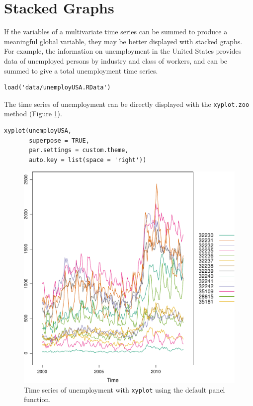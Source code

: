 \section{Stacked Graphs \label{sec:stacked}}
\label{sec:orge4c4b7a}
If the variables of a multivariate time series can be summed to
produce a meaningful global variable, they may be better displayed
with stacked graphs. For example, the information on unemployment in
the United States provides data of unemployed persons by industry and
class of workers, and can be summed to give a total unemployment time
series.

\lstset{language=r,label= ,caption= ,captionpos=b,numbers=none}
\begin{lstlisting}
load('data/unemployUSA.RData')
\end{lstlisting}

The time series of unemployment can be directly displayed
with the \texttt{xyplot.zoo} method (Figure \ref{fig:unemployUSAxyplot}).

\lstset{language=r,label= ,caption= ,captionpos=b,numbers=none}
\begin{lstlisting}
xyplot(unemployUSA,
       superpose = TRUE,
       par.settings = custom.theme,
       auto.key = list(space = 'right'))
\end{lstlisting}

\begin{figure}[htbp]
\centering
\includegraphics[width=.9\linewidth]{figs/unemployUSAxyplot.pdf}
\caption{Time series of unemployment  with \texttt{xyplot} using the default panel function. \label{fig:unemployUSAxyplot}}
\end{figure}

